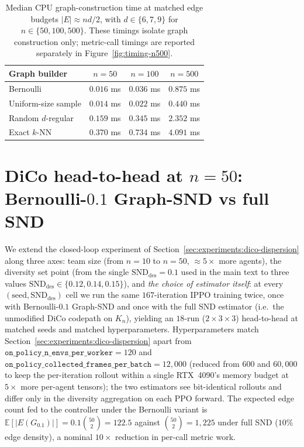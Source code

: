 \documentclass{article}
\theoremstyle{plain}
\theoremstyle{definition}
\theoremstyle{remark}
\newcommand{\SND}{\ensuremath{\mathrm{SND}}}
\begin{document}
\begin{table}[t]
\centering
\small
\begin{tabular}{lccc}
\toprule
\textbf{Graph builder} & \textbf{$n=50$} & \textbf{$n=100$} & \textbf{$n=500$} \\
\midrule
Bernoulli & $0.016$ ms & $0.036$ ms & $0.875$ ms \\
Uniform-size sample & $0.014$ ms & $0.022$ ms & $0.440$ ms \\
Random $d$-regular & $0.159$ ms & $0.345$ ms & $2.352$ ms \\
Exact $k$-NN & $0.370$ ms & $0.734$ ms & $4.091$ ms \\
\bottomrule
\end{tabular}
\caption{Median CPU graph-construction time at matched edge budgets
$|E|\approx nd/2$, with $d\in\{6,7,9\}$ for
$n\in\{50,100,500\}$. These timings isolate graph construction only;
metric-call timings are reported separately in
Figure~\ref{fig:timing-n500}.}
\label{tab:graph-build}
\end{table}

\section{DiCo head-to-head at $n{=}50$: Bernoulli-$0.1$ Graph-SND vs full SND}
\label{app:dico-n50-sweep}

We extend the closed-loop experiment of
Section~\ref{sec:experiments:dico-dispersion} along three axes: team
size (from $n{=}10$ to $n{=}50$, ${\approx}5\times$ more agents), the
diversity set point (from the single $\SND_{\mathrm{des}}{=}0.1$ used
in the main text to three values
$\SND_{\mathrm{des}}\in\{0.12,0.14,0.15\}$), and \emph{the choice of
estimator itself}: at every $(\mathrm{seed},\SND_{\mathrm{des}})$
cell we run the same $167$-iteration IPPO training twice, once with
Bernoulli-$0.1$ Graph-SND and once with the full SND estimator
(i.e.\ the unmodified DiCo codepath on $K_n$), yielding an
$18$-run ($2{\times}3{\times}3$) head-to-head at matched seeds and
matched hyperparameters. Hyperparameters match
Section~\ref{sec:experiments:dico-dispersion} apart from
$\texttt{on\_policy\_n\_envs\_per\_worker}{=}120$ and
$\texttt{on\_policy\_collected\_frames\_per\_batch}{=}12{,}000$
(reduced from $600$ and $60{,}000$ to keep the per-iteration rollout
within a single RTX~4090's memory budget at $5{\times}$ more
per-agent tensors); the two estimators see bit-identical rollouts
and differ only in the diversity aggregation on each PPO forward.
The expected edge count fed to the controller under the Bernoulli
variant is $\mathbb{E}[|E(G_{0.1})|]{=}0.1\binom{50}{2}{=}122.5$
against $\binom{50}{2}{=}1{,}225$ under full SND ($10\%$ edge
density), a nominal $10\times$ reduction in per-call metric work.
\end{document}
